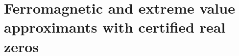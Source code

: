 \chapter{Ferromagnetic and extreme value approximants with certified real zeros}\label{vol2:ch18}




